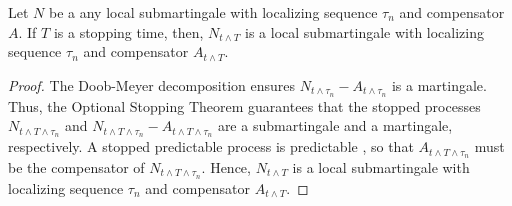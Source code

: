 \documentclass[aoas,preprint]{imsart}
\begin{document}
\begin{lemma}
    Let $N$ be a any local submartingale with localizing sequence $\tau_n$
    and compensator $A$.  If $T$ is a stopping time, then, $N_{t\wedge T}$ is
    a local submartingale with localizing sequence $\tau_n$
    and compensator $A_{t \wedge T}$.
\end{lemma}
\begin{proof}
    The Doob-Meyer decomposition ensures
    $N_{t \wedge \tau_n} - A_{t \wedge \tau_n}$ is a martingale.  Thus,
    the Optional Stopping Theorem guarantees that the stopped processes
    $N_{t \wedge T \wedge \tau_n}$ and
    $N_{t \wedge T \wedge \tau_n} - A_{t \wedge T \wedge \tau_n}$ are
    a submartingale and a martingale, respectively.  
    A stopped predictable process is predictable
    \cite[Prop. 2.4]{jacod1987limit}, so that $A_{t \wedge T \wedge \tau_n}$
    must be the compensator of $N_{t \wedge T \wedge \tau_n}$.
    Hence,
    $N_{t \wedge T}$ is a local submartingale with
    localizing sequence $\tau_n$ and compensator $A_{t \wedge T}$.
\end{proof}
\end{document}
